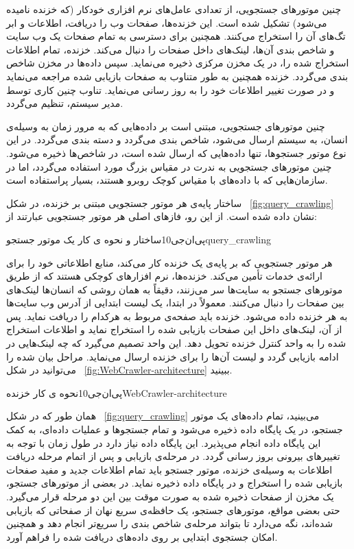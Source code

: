 چنین موتورهای جستجویی، از تعدادی عامل‌های نرم افزاری خودکار (که خزنده نامیده می‌شود) تشکیل شده است. این خزنده‌ها، صفحات وب را دریافت، اطلاعات و ابر تگ‌های آن را استخراج می‌کنند. همچنین برای دسترسی به تمام صفحات یک وب سایت و شاخص بندی آن‌ها، لینک‌های داخل صفحات را دنبال می‌کند. خزنده، تمام اطلاعات استخراج شده را، در یک مخزن مرکزی ذخیره می‌نماید. سپس داده‌ها در مخزن شاخص بندی می‌گردد. خزنده همچنین به طور متناوب به صفحات بازیابی شده مراجعه می‌نماید و در صورت تغییر اطلاعات خود را به روز رسانی می‌نماید. تناوب چنین کاری توسط مدیر سیستم، تنظیم می‌گردد.


چنین موتورهای جستجویی، مبتنی است بر داده‌هایی که به مرور زمان به وسیله‌ی انسان، به سیستم ارسال می‌شود، شاخص بندی می‌گردد و دسته بندی می‌گردد. در این نوع موتور جستجوها، تنها داده‌هایی که ارسال شده است، در شاخص‌ها ذخیره می‌شود. چنین موتورهای جستجویی به ندرت در مقیاس بزرگ مورد استفاده می‌گردد، اما در سازمان‌هایی که با داده‌های با مقیاس کوچک روبرو هستند، بسیار پراستفاده است.


ساختار پایه‌ی هر موتور جستجویی مبتنی بر خزنده، در شکل ~\ref{fig:query_crawling} نشان داده شده است. از این رو، فازهای اصلی هر موتور جستجویی عبارتند از:

‌پی‌ان‌جی{10}{ساختار و نحوه ی کار یک موتور جستجو}{query_crawling}


هر موتور جستجویی که بر پایه‌ی یک خزنده کار می‌کند، منابع اطلاعاتی خود را برای ارائه‌ی خدمات تأمین می‌کند. خزنده‌ها، نرم افزارهای کوچکی هستند که از طریق موتورهای جستجو به سایت‌ها سر می‌زنند، دقیقاً به‌‌ همان روشی که انسان‌ها لینک‌های بین صفحات را دنبال می‌کنند. معمولاً در ابتدا، یک لیست ابتدایی از آدرس وب سایت‌ها به هر خزنده داده می‌شود. خزنده باید صفحه‌ی مربوط به هرکدام را دریافت نماید. پس از آن، لینک‌های داخل این صفحات بازیابی شده را استخراج نماید و اطلاعات استخراج شده را به واحد کنترل خزنده تحویل دهد. این واحد تصمیم می‌گیرد که چه لینک‌هایی در ادامه بازیابی گردد و لیست آن‌ها را برای خزنده ارسال می‌نماید.
مراحل بیان شده را می‌توانید در شکل ~\ref {fig:WebCrawler-architecture} ببینید.

‌پی‌ان‌جی{10}{نحوه ی کار خزنده}{WebCrawler-architecture}

همان طور که در شکل ~\ref{fig:query_crawling} می‌بینید، تمام داده‌های یک موتور جستجو، در یک پایگاه داده ذخیره می‌شود و تمام جستجو‌ها و عملیات داده‌ای، به کمک این پایگاه داده انجام می‌پذیرد. این پایگاه داده نیاز دارد در طول زمان با توجه به تغییرهای بیرونی بروز رسانی گردد. در مرحله‌ی بازیابی و پس از اتمام مرحله دریافت اطلاعات به وسیله‌ی خزنده، موتور جستجو باید تمام اطلاعات جدید و مفید صفحات بازیابی شده را استخراج و در پایگاه داده ذخیره نماید. در بعضی از موتورهای جستجو، یک مخزن از صفحات ذخیره شده به صورت موقت بین این دو مرحله قرار می‌گیرد. حتی بعضی مواقع، موتورهای جستجو، یک حافظه‌ی سریع نهان از صفحاتی که بازیابی شده‌اند، نگه می‌دارد تا بتواند مرحله‌ی شاخص بندی را سریع‌تر انجام دهد و همچنین امکان جستجوی ابتدایی بر روی داده‌های دریافت شده را فراهم آورد.

